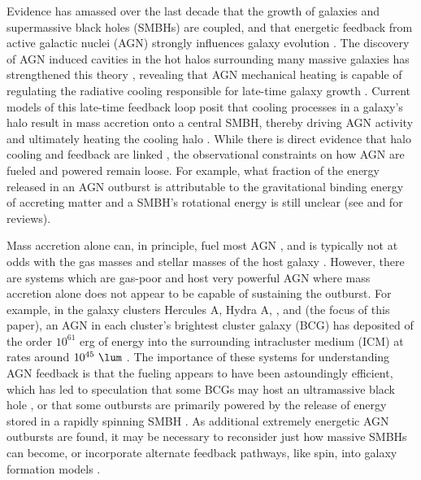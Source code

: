 \documentclass[iop]{emulateapj-rtx4}
\begin{document}
Evidence has amassed over the last decade that the growth of galaxies
and supermassive black holes (SMBHs) are coupled, and that energetic
feedback from active galactic nuclei (AGN) strongly influences galaxy
evolution \citep[\eg][]{1995ARA&A..33..581K, magorrian,
  1998A&A...331L...1S, 2000MNRAS.311..576K, 2000ApJ...539L...9F,
  2000ApJ...539L..13G, 2002ApJ...574..740T}. The discovery of AGN
induced cavities in the hot halos surrounding many massive galaxies
has strengthened this theory \citep[see][for a review]{mcnamrev},
revealing that AGN mechanical heating is capable of regulating the
radiative cooling responsible for late-time galaxy growth
\citep[\eg][]{birzan04, dunn06, rafferty06}. Current models of this
late-time feedback loop posit that cooling processes in a galaxy's
halo result in mass accretion onto a central SMBH, thereby driving AGN
activity and ultimately heating the cooling halo
\citep[\eg][]{croton06, bower06, sijacki07}. While there is direct
evidence that halo cooling and feedback are linked
\citep[\eg][]{haradent, rafferty08}, the observational constraints on
how AGN are fueled and powered remain loose. For example, what
fraction of the energy released in an AGN outburst is attributable to
the gravitational binding energy of accreting matter and a SMBH's
rotational energy is still unclear (see \citealt{1984RvMP...56..255B}
and \citealt{2002NewAR..46..247M} for reviews).

Mass accretion alone can, in principle, fuel most AGN
\citep[\eg][]{pizzolato05, 2006MNRAS.372...21A}, and is typically not
at odds with the gas masses and stellar masses of the host galaxy
\citep[\eg][]{rafferty06}. However, there are systems which are
gas-poor and host very powerful AGN where mass accretion alone does
not appear to be capable of sustaining the outburst. For example, in
the galaxy clusters Hercules A, Hydra A, \ms, and \rbs (the focus of
this paper), an AGN in each cluster's brightest cluster galaxy (BCG)
has deposited of the order $10^{61}$ erg of energy into the
surrounding intracluster medium (ICM) at rates around $10^{45} ~\lum$
\citep{herca, hydraa, ms0735}. The importance of these systems for
understanding AGN feedback is that the fueling appears to have been
astoundingly efficient, which has led to speculation that some BCGs
may host an ultramassive black hole \citep[$> 10^{10} ~\msol$;
  \eg][]{msspin}, or that some outbursts are primarily powered by the
release of energy stored in a rapidly spinning SMBH
\citep[\eg][]{minaspin}. As additional extremely energetic AGN
outbursts are found, it may be necessary to reconsider just how
massive SMBHs can become, or incorporate alternate feedback pathways,
like spin, into galaxy formation models
\citep[\eg][]{2003ApJ...585L.101H, 2007ApJ...658..815S,
  2009MNRAS.397.1302B}.
\end{document}
